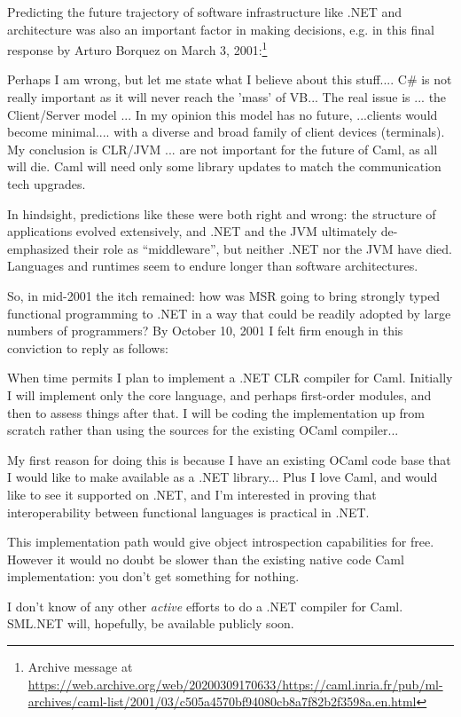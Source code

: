 \documentclass[acmsmall]{acmart}\settopmatter{}
\begin{document}
Predicting the future trajectory of software infrastructure like .NET and architecture was also an important factor in making decisions, e.g. in this final response by Arturo Borquez on March 3, 2001:\footnote{Archive message at \url{https://web.archive.org/web/20200309170633/https://caml.inria.fr/pub/ml-archives/caml-list/2001/03/c505a4570bf94080cb8a7f82b2f3598a.en.html}}
\begin{verbquote}
Perhaps I am wrong, but let me state what I believe about this stuff.... C\# is not really important as it will never reach the 'mass' of VB... The real issue is ... the Client/Server model ... In my opinion this model has no future, ...clients would become minimal.... with a diverse and broad family of client devices (terminals). My conclusion is CLR/JVM ... are not important for the future of Caml, as all will die. Caml will need only some library updates to match the communication tech upgrades.  
\end{verbquote}
In hindsight, predictions like these were both right and wrong: the structure of applications evolved extensively, and .NET and the JVM ultimately de-emphasized their role as “middleware”, but neither .NET nor the JVM have died.  Languages and runtimes seem to endure longer than software architectures.

So, in mid-2001 the itch remained: how was MSR going to bring strongly typed functional programming to .NET in a way that could be readily adopted by large numbers of programmers?  By October 10, 2001 I felt firm enough in this conviction to reply as follows:

\begin{verbquote}
When time permits I plan to implement a .NET CLR compiler for Caml. Initially I will implement only the core language, and perhaps first-order modules, and then to assess things after that.  I will be coding the implementation up from scratch rather than using the sources for the existing OCaml compiler...

My first reason for doing this is because I have an existing OCaml code base that I would like to make available as a .NET library...  Plus I love Caml, and would like to see it supported on .NET, and I'm interested in proving that interoperability between functional languages is practical in .NET. 

This implementation path would give object introspection capabilities for free.  However it would no doubt be slower than the existing native code Caml implementation: you don't get something for nothing.

I don't know of any other \emph{active} efforts to do a .NET compiler for Caml.  SML.NET will, hopefully, be available publicly soon.
\end{verbquote}
\end{document}
